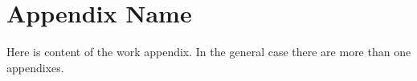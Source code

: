 \section{Appendix Name}
\label{sec:Appendix_}

Here is content of the work appendix. In the general case there are more than one appendixes.